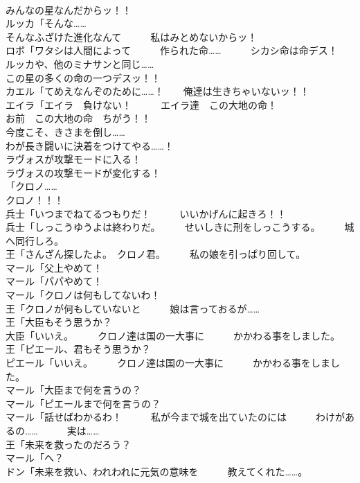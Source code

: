 \documentclass[8pt]{extreport}
\begin{document}
\begin{CJK}{UTF8}{min}
\\	みんなの星なんだからッ！！	
\\	ルッカ「そんな……	
\\	そんなふざけた進化なんて　　　私はみとめないからッ！	
\\	ロボ「ワタシは人間によって　　　作られた命……　　　シカシ命は命デス！　　　ルッカや、他のミナサンと同じ……	
\\	この星の多くの命の一つデスッ！！	
\\	カエル「てめえなんぞのために……！　　俺達は生きちゃいないッ！！	
\\	エイラ「エイラ　負けない！　　　エイラ達　この大地の命！	
\\	お前　この大地の命　ちがう！！	
\\	今度こそ、きさまを倒し……	
\\	わが長き闘いに決着をつけてやる……！	
\\	ラヴォスが攻撃モードに入る！	
\\	ラヴォスの攻撃モードが変化する！	
\\	「クロノ……	
\\	クロノ！！！	
\\	兵士「いつまでねてるつもりだ！　　　いいかげんに起きろ！！	
\\	兵士「しっこうゆうよは終わりだ。　　　せいしきに刑をしっこうする。　　　城へ同行しろ。	
\\	王「さんざん探したよ。　クロノ君。　　　私の娘を引っぱり回して。	
\\	マール「父上やめて！	
\\	マール「パパやめて！	
\\	マール「クロノは何もしてないわ！	
\\	王「クロノが何もしていないと　　　娘は言っておるが……	
\\	王「大臣もそう思うか？	
\\	大臣「いいえ。　　　クロノ達は国の一大事に　　　かかわる事をしました。	
\\	王「ピエール、君もそう思うか？	
\\	ピエール「いいえ。　　　クロノ達は国の一大事に　　　かかわる事をしました。	
\\	マール「大臣まで何を言うの？	
\\	マール「ピエールまで何を言うの？	
\\	マール「話せばわかるわ！　　　私が今まで城を出ていたのには　　　わけがあるの……　　　実は……	
\\	王「未来を救ったのだろう？	
\\	マール「へ？	
\\	ドン「未来を救い、われわれに元気の意味を　　　教えてくれた……。	

\end{CJK}
\end{document}
